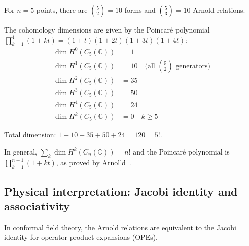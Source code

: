 \begin{example}[\texorpdfstring{$n=5$}{n=5}: complete computation]
\label{ex:arnold-n5-complete}

For $n=5$ points, there are $\binom{5}{2} = 10$ forms and $\binom{5}{3} = 10$ Arnold 
relations.

The cohomology dimensions are given by the Poincar\'e polynomial
$\prod_{k=1}^{4}(1+kt) = (1+t)(1+2t)(1+3t)(1+4t)$:
\begin{align}
\dim H^0(C_5(\mathbb{C})) &= 1\\
\dim H^1(C_5(\mathbb{C})) &= 10 \quad \text{(all $\binom{5}{2}$ generators)}\\
\dim H^2(C_5(\mathbb{C})) &= 35\\
\dim H^3(C_5(\mathbb{C})) &= 50\\
\dim H^4(C_5(\mathbb{C})) &= 24\\
\dim H^k(C_5(\mathbb{C})) &= 0 \quad k \geq 5
\end{align}

Total dimension: $1 + 10 + 35 + 50 + 24 = 120 = 5!$.

In general, $\sum_k \dim H^k(C_n(\mathbb{C})) = n!$ and the Poincar\'e polynomial
is $\prod_{k=1}^{n-1}(1+kt)$, as proved by Arnol'd~\cite{Arnold69}.
\end{example}

\subsection{Physical interpretation: Jacobi identity and associativity}
\label{sec:arnold-physical}

\begin{theorem}[Arnold relations = Jacobi identity; \ClaimStatusProvedHere]
\label{thm:arnold-jacobi}
In conformal field theory, the Arnold relations are equivalent to the Jacobi identity 
for operator product expansions (OPEs).
\end{theorem}

